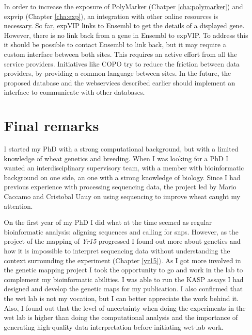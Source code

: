 In order to increase the exposure of PolyMarker (Chatper \ref{cha:polymarker}) and \gls{expvip} (Chapter \ref{cha:exp}), an integration with other online resources is necessary. 
So far, expVIP links to Ensembl to get the details of a displayed gene. 
However, there is no link back from a gene in Ensembl to expVIP. 
To address this it should be possible to contact Ensembl to link back, but it may require a custom interface between both sites. 
This requires an active effort from all the service providers. 
Initiatives like COPO try to reduce the friction between data providers, by providing a common language between sites. 
In the future, the proposed database and the webservices described earlier should implement an interface to communicate with other databases. 

\section{Final remarks}

I started my PhD with a strong computational background, but with a limited knowledge of wheat genetics and breeding.
When I was looking for a PhD I wanted an interdisciplinary supervisory team, with a member with bioinformatic background on one side, an one with a strong knowledge of biology. 
Since I had previous experience with processing sequencing data, the project led by Mario Caccamo and Cristobal Uauy on using sequencing to improve wheat caught my attention.

On the first year of my PhD I did what at the time seemed as regular bioinformatic analysis: aligning sequences and calling for \glspl{snp}. 
However, as the project of the mapping of \textit{Yr15} progressed I found out more about genetics and how it is impossible to interpret sequencing data without understanding the context surrounding the experiment (Chapter \ref{yr15}). 
As I got more involved in the genetic mapping project I took the opportunity to go and work in the lab to complement my bioinformatic abilities. 
I was able to run the KASP assays I had designed and develop the genetic maps for my publication. 
I also confirmed that the wet lab is not my vocation, but I can better appreciate the work behind it. 
Also, I found out that the level of uncertainty when doing the experiments in the wet lab is higher than doing the computational analysis and the importance of generating high-quality data interpretation before initiating wet-lab work.


